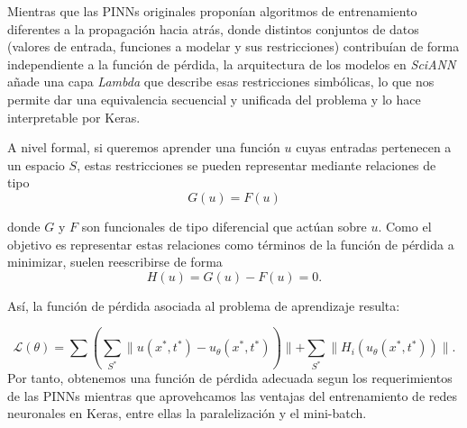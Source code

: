 Mientras que las PINNs originales proponían algoritmos de entrenamiento diferentes a la propagación hacia atrás, donde distintos conjuntos de datos (valores de entrada, funciones a modelar y sus restricciones) contribuían de forma independiente a la función de pérdida, la arquitectura de los modelos en \textit{SciANN} añade una capa \textit{Lambda} que describe esas restricciones simbólicas, lo que nos permite dar una equivalencia secuencial y unificada del problema y lo hace interpretable por Keras. 

A nivel formal, si queremos aprender una función $u$ cuyas entradas pertenecen a un espacio $S$, estas restricciones se pueden representar mediante relaciones de tipo 
\begin{equation}
    G(u) = F(u) 
\end{equation}

donde $G$ y $F$ son funcionales de tipo diferencial que actúan sobre $u$. Como el objetivo es representar estas relaciones como términos de la función de pérdida a minimizar, suelen reescribirse de forma
\begin{equation}
    H(u) = G(u) - F(u) = 0.
\end{equation}

Así, la función de pérdida asociada al problema de aprendizaje resulta:

\begin{equation}
    \mathcal{L}(\theta) = \sum (\sum_{S^*} \parallel u(x^*,t^*) - u_{\theta}(x^*,t^*)) \parallel + \sum_{S^*} \parallel H_i(u_{\theta}(x^*,t^*))\parallel.
\end{equation}
Por tanto, obtenemos una función de pérdida adecuada segun los requerimientos de las PINNs mientras que aprovehcamos las ventajas del entrenamiento de redes neuronales en Keras, entre ellas la paralelización y el mini-batch.




